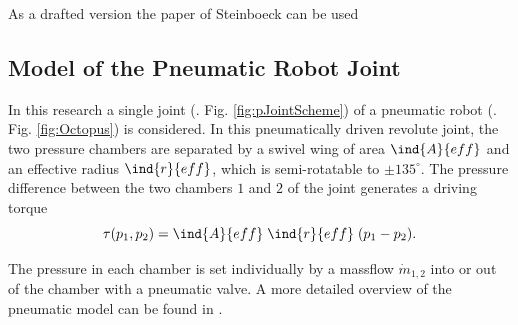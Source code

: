 \documentclass[conference]{IEEEtran}
\newcommand{\Aeff}{\ind{A}{eff} }
\newcommand{\Reff}{\ind{r}{eff}}
\begin{document}
As a drafted version the paper of Steinboeck can be used \cite{STADLER2022105071}

\subsection{Model of the Pneumatic Robot Joint}

In this research a single joint (\cf. Fig. \ref{fig:pJointScheme}) of
a pneumatic robot (\cf. Fig. \ref{fig:Octopus}) is considered.  In
this pneumatically driven revolute joint, the two pressure chambers
are separated by a swivel wing of area $\Aeff$ and an effective radius
$\Reff$, which is semi-rotatable to $\pm 135^\circ$. The pressure
difference between the two chambers $1$ and $2$ of the joint generates
a driving torque
\begin{equation}\label{drvtrq}
  \tau(p_1, p_2) = \Aeff \; \Reff \; (p_1-p_2).
\end{equation}


The pressure in each chamber is set individually by a massflow
$\dot m_{1,2}$ into or out of the chamber with a pneumatic valve. A
more detailed overview of the pneumatic model can be found in
\cite{Hoffmann2021}.
\end{document}
